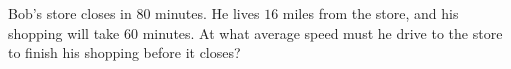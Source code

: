 Bob's store closes in $80$ minutes. He lives $16$ miles from the store, and his shopping will take $60$ minutes. At what average speed must he drive to the store to finish his shopping before it closes?
